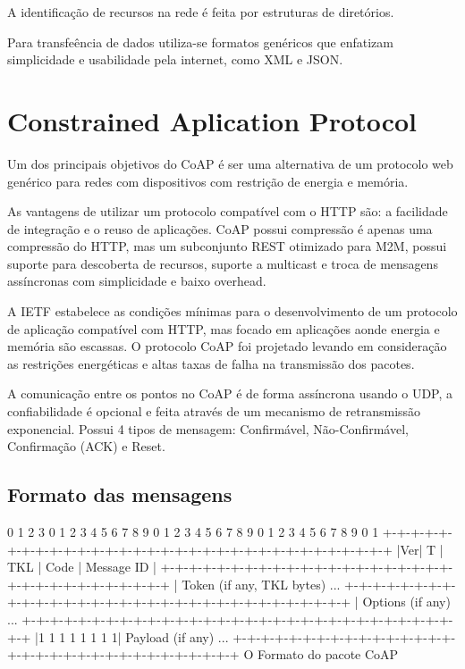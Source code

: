 A identificação de recursos na rede é feita por estruturas de diret\'orios.

Para transfe\^encia de dados utiliza-se formatos genéricos que enfatizam simplicidade e usabilidade pela internet, como XML e JSON.

\section{Constrained Aplication Protocol}

Um dos principais objetivos do CoAP \'e ser uma alternativa de um protocolo web gen\'erico para redes com dispositivos com restri\c{c}\~ao de energia e mem\'oria.

As vantagens de utilizar um protocolo compat\'ivel com o HTTP s\~ao: a facilidade de integra\c{c}\~ao e o reuso de aplica\c{c}\~oes. CoAP possui compress\~ao \'e apenas uma compress\~ao do HTTP, mas um subconjunto REST otimizado para M2M, possui suporte para descoberta de recursos, suporte a multicast e troca de mensagens ass\'incronas com simplicidade e baixo overhead.

A IETF estabelece as condi\c{c}\~oes m\'inimas para o desenvolvimento de um protocolo de aplica\c{c}\~ao compat\'ivel com HTTP, mas focado em aplica\c{c}\~oes aonde energia e mem\'oria s\~ao escassas. O protocolo CoAP foi projetado levando em considera\c{c}\~ao as restri\c{c}\~oes energ\'eticas e altas taxas de falha na transmiss\~ao dos pacotes.

A comunica\c{c}\~ao entre os pontos no CoAP \'e de forma ass\'incrona usando o UDP, a confiabilidade \'e opcional e feita atrav\'es de um mecanismo de retransmiss\~ao exponencial. Possui 4 tipos de mensagem: Confirm\'avel, N\~ao-Confirm\'avel, Confirma\c{c}\~ao (ACK) e Reset.

\subsection{Formato das mensagens}

     0                   1                   2                   3
    0 1 2 3 4 5 6 7 8 9 0 1 2 3 4 5 6 7 8 9 0 1 2 3 4 5 6 7 8 9 0 1
   +-+-+-+-+-+-+-+-+-+-+-+-+-+-+-+-+-+-+-+-+-+-+-+-+-+-+-+-+-+-+-+-+
   |Ver| T |  TKL  |      Code     |          Message ID           |
   +-+-+-+-+-+-+-+-+-+-+-+-+-+-+-+-+-+-+-+-+-+-+-+-+-+-+-+-+-+-+-+-+
   |   Token (if any, TKL bytes) ...
   +-+-+-+-+-+-+-+-+-+-+-+-+-+-+-+-+-+-+-+-+-+-+-+-+-+-+-+-+-+-+-+-+
   |   Options (if any) ...
   +-+-+-+-+-+-+-+-+-+-+-+-+-+-+-+-+-+-+-+-+-+-+-+-+-+-+-+-+-+-+-+-+
   |1 1 1 1 1 1 1 1|    Payload (if any) ...
   +-+-+-+-+-+-+-+-+-+-+-+-+-+-+-+-+-+-+-+-+-+-+-+-+-+-+-+-+-+-+-+-+
   O Formato do pacote CoAP  \cite{draft-ietf-core-coap-18}


